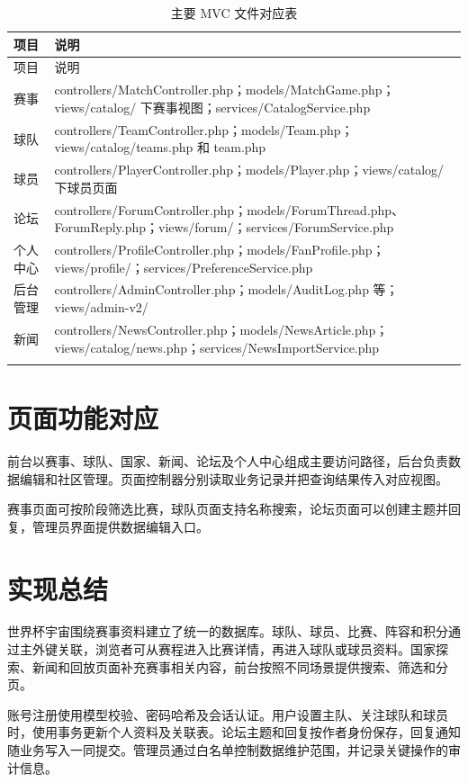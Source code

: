 \documentclass[UTF8,a4paper,11pt]{ctexart}
\begin{document}
\begin{longtable}{>{\raggedright\arraybackslash}p{}>{\raggedright\arraybackslash}p{}}\toprule 项目 & 说明\\\midrule\endfirsthead\toprule 项目 & 说明\\\midrule\endhead
赛事 & controllers/MatchController.php；models/MatchGame.php；views/catalog/ 下赛事视图；services/CatalogService.php\\\midrule
球队 & controllers/TeamController.php；models/Team.php；views/catalog/teams.php 和 team.php\\\midrule
球员 & controllers/PlayerController.php；models/Player.php；views/catalog/ 下球员页面\\\midrule
论坛 & controllers/ForumController.php；models/ForumThread.php、ForumReply.php；views/forum/；services/ForumService.php\\\midrule
个人中心 & controllers/ProfileController.php；models/FanProfile.php；views/profile/；services/PreferenceService.php\\\midrule
后台管理 & controllers/AdminController.php；models/AuditLog.php 等；views/admin-v2/\\\midrule
新闻 & controllers/NewsController.php；models/NewsArticle.php；views/catalog/news.php；services/NewsImportService.php\\\midrule
\bottomrule\caption{主要 MVC 文件对应表}\end{longtable}
\section{页面功能对应}
前台以赛事、球队、国家、新闻、论坛及个人中心组成主要访问路径，后台负责数据编辑和社区管理。页面控制器分别读取业务记录并把查询结果传入对应视图。

赛事页面可按阶段筛选比赛，球队页面支持名称搜索，论坛页面可以创建主题并回复，管理员界面提供数据编辑入口。

\section{实现总结}
世界杯宇宙围绕赛事资料建立了统一的数据库。球队、球员、比赛、阵容和积分通过主外键关联，浏览者可从赛程进入比赛详情，再进入球队或球员资料。国家探索、新闻和回放页面补充赛事相关内容，前台按照不同场景提供搜索、筛选和分页。

账号注册使用模型校验、密码哈希及会话认证。用户设置主队、关注球队和球员时，使用事务更新个人资料及关联表。论坛主题和回复按作者身份保存，回复通知随业务写入一同提交。管理员通过白名单控制数据维护范围，并记录关键操作的审计信息。
\end{document}
